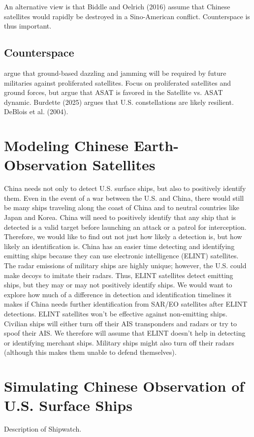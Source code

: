 \documentclass[12pt]{article}
\begin{document}
An alternative view is that 
Biddle and Oelrich (2016) assume that Chinese satellites would rapidly be destroyed in a Sino-American conflict. Counterspace is thus important.


\subsection{Counterspace}
\autocite{biddleFutureWarfareWestern2016} argue that ground-based dazzling and jamming will be required by future militaries against proliferated satellites. Focus on proliferated satellites and ground forces, but argue that ASAT is favored in the Satellite vs. ASAT dynamic. Burdette (2025) argues that U.S. constellations are likely resilient. DeBlois et al. (2004).

\section{Modeling Chinese Earth-Observation Satellites}
China needs not only to detect U.S. surface ships, but also to positively identify them. Even in the event of a war between the U.S. and China, there would still be many ships traveling along the coast of China and to neutral countries like Japan and Korea. China will need to positively identify that any ship that is detected is a valid target before launching an attack or a patrol for interception. Therefore, we would like to find out not just how likely a detection is, but how likely an identification is. China has an easier time detecting and identifying emitting ships because they can use electronic intelligence (ELINT) satellites. The radar emissions of military ships are highly unique; however, the U.S. could make decoys to imitate their radars. Thus, ELINT satellites detect emitting ships, but they may or may not positively identify ships. We would want to explore how much of a difference in detection and identification timelines it makes if China needs further identification from SAR/EO satellites after ELINT detections. ELINT satellites won't be effective against non-emitting ships. Civilian ships will either turn off their AIS transponders and radars or try to spoof their AIS. We therefore will assume that ELINT doesn't help in detecting or identifying merchant ships. Military ships might also turn off their radars (although this makes them unable to defend themselves).

\section{Simulating Chinese Observation of U.S. Surface Ships}
Description of Shipwatch.
\end{document}
